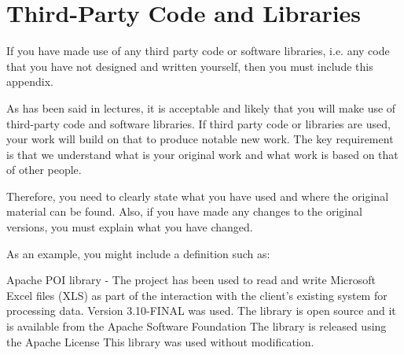 \chapter{Third-Party Code and Libraries}

If you have made use of any third party code or software libraries, i.e. any code that you have not designed and written yourself, then you must include this appendix. 

As has been said in lectures, it is acceptable and likely that you will make use of third-party code and software libraries. If third party code or libraries are used, your work will build on that to produce notable new work. The key requirement is that we understand what is your original work and what work is based on that of other people. 

Therefore, you need to clearly state what you have used and where the original material can be found. Also, if you have made any changes to the original versions, you must explain what you have changed. 

As an example, you might include a definition such as: 

Apache POI library - The project has been used to read and write Microsoft Excel files (XLS) as part of the interaction with the client's existing system for processing data. Version 3.10-FINAL was used. The library is open source and it is available from the Apache Software Foundation 
The library is released using the Apache License 
This library was used without modification. 
